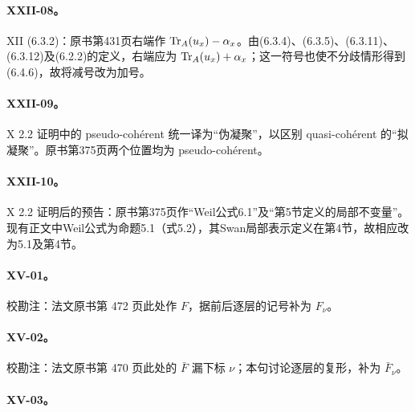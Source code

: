 \hypertarget{collation-XXII-08}{}

\paragraph*{XXII-08。}

XII (6.3.2)：原书第431页右端作 $\operatorname{Tr}_A(u_x)-\alpha_x$。由(6.3.4)、(6.3.5)、(6.3.11)、(6.3.12)及(6.2.2)的定义，右端应为 $\operatorname{Tr}_A(u_x)+\alpha_x$；这一符号也使不分歧情形得到(6.4.6)，故将减号改为加号。

\hypertarget{collation-XXII-09}{}

\paragraph*{XXII-09。}

X 2.2 证明中的 pseudo-cohérent 统一译为“伪凝聚”，以区别 quasi-cohérent 的“拟凝聚”。原书第375页两个位置均为 pseudo-cohérent。

\hypertarget{collation-XXII-10}{}

\paragraph*{XXII-10。}

X 2.2 证明后的预告：原书第375页作“Weil公式6.1”及“第5节定义的局部不变量”。现有正文中Weil公式为命题5.1（式5.2），其Swan局部表示定义在第4节，故相应改为5.1及第4节。

\hypertarget{collation-XV-01}{}

\paragraph*{XV-01。}

校勘注：法文原书第 472 页此处作 $F$，据前后逐层的记号补为 $F_\nu$。

\hypertarget{collation-XV-02}{}

\paragraph*{XV-02。}

校勘注：法文原书第 470 页此处的 $\bar F$ 漏下标 $\nu$；本句讨论逐层的复形，补为 $\bar F_\nu$。

\hypertarget{collation-XV-03}{}

\paragraph*{XV-03。}

